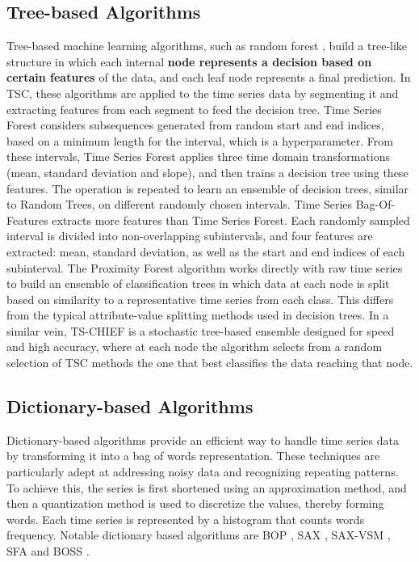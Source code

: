 \subsection{Tree-based Algorithms}


Tree-based machine learning algorithms, such as random forest \cite{breiman2001random}, build a tree-like structure in which each internal \textbf{node represents a decision based on certain features} of the data, and each leaf node represents a final prediction. In TSC, these algorithms are applied to the time series data by segmenting it and extracting features from each segment to feed the decision tree.
Time Series Forest \cite{deng2013time} considers subsequences generated from random start and end indices, based on a minimum length for the interval, which is a hyperparameter. From these intervals, Time Series Forest applies three time domain transformations (mean, standard deviation and slope), and then trains a decision tree using these features. The operation is repeated to learn an ensemble of decision trees, similar to Random Trees, on different randomly chosen intervals.
Time Series Bag-Of-Features \cite{baydogan2013bag} extracts more features than Time Series Forest. Each randomly sampled interval is divided into non-overlapping subintervals, and four features are extracted: mean, standard deviation, as well as the start and end indices of each subinterval.
The Proximity Forest algorithm \cite{lucas2019proximity} works directly with raw time series to  build an ensemble of classification trees in which data at each node is split based on similarity to a representative time series from each class. This differs from the typical attribute-value splitting methods used in decision trees.
In a similar vein, TS-CHIEF \cite{shifaz2020ts} is a stochastic tree-based ensemble designed for speed and high accuracy, where at each node the algorithm selects from a random selection of TSC methods the one that best classifies the data reaching that node.


\subsection{Dictionary-based Algorithms}

Dictionary-based algorithms provide an efficient way to handle time series data by transforming it into a bag of words representation. These techniques are particularly adept at addressing noisy data and recognizing repeating patterns. To achieve this, the series is first shortened using an approximation method, and then a quantization method is used to discretize the values, thereby forming words. Each time series is represented by a histogram that counts words frequency. Notable dictionary based algorithms are BOP \cite{lin2012rotation}, SAX \cite{lin2003symbolic}, SAX-VSM \cite{senin2013sax}, SFA \cite{schafer2012sfa} and BOSS \cite{schafer2015boss}. 


